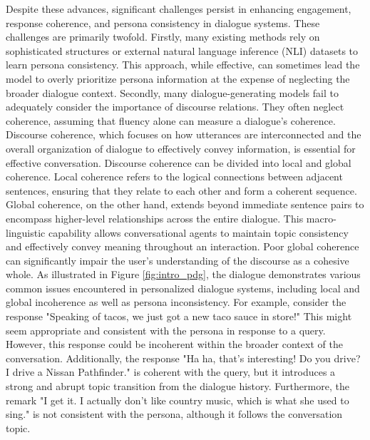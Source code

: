 Despite these advances, significant challenges persist in enhancing engagement, response coherence, and persona consistency in dialogue systems. These challenges are primarily twofold. Firstly, many existing methods rely on sophisticated structures or external natural language inference (NLI) datasets to learn persona consistency. This approach, while effective, can sometimes lead the model to overly prioritize persona information at the expense of neglecting the broader dialogue context. Secondly, many dialogue-generating models fail to adequately consider the importance of discourse relations. They often neglect coherence, assuming that fluency alone can measure a dialogue's coherence. Discourse coherence, which focuses on how utterances are interconnected and the overall organization of dialogue to effectively convey information, is essential for effective conversation. Discourse coherence can be divided into local and global coherence. Local coherence refers to the logical connections between adjacent sentences, ensuring that they relate to each other and form a coherent sequence. Global coherence, on the other hand, extends beyond immediate sentence pairs to encompass higher-level relationships across the entire dialogue. This macro-linguistic capability allows conversational agents to maintain topic consistency and effectively convey meaning throughout an interaction. Poor global coherence can significantly impair the user's understanding of the discourse as a cohesive whole. As illustrated in Figure \ref{fig:intro_pdg}, the dialogue demonstrates various common issues encountered in personalized dialogue systems, including local and global incoherence as well as persona inconsistency. For example, consider the response "Speaking of tacos, we just got a new taco sauce in store!" This might seem appropriate and consistent with the persona in response to a query. However, this response could be incoherent within the broader context of the conversation. Additionally, the response "Ha ha, that's interesting! Do you drive? I drive a Nissan Pathfinder." is coherent with the query, but it introduces a strong and abrupt topic transition from the dialogue history. Furthermore, the remark "I get it. I actually don't like country music, which is what she used to sing." is not consistent with the persona, although it follows the conversation topic.


